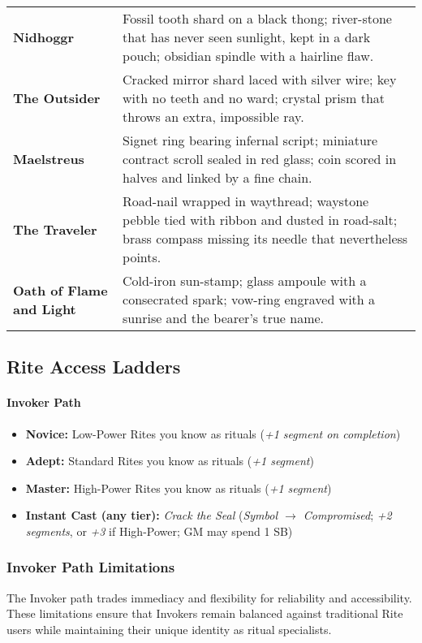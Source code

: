 \documentclass[12pt,twoside]{book}
\begin{document}
\begin{table}[htbp]
\begin{tabular}{>{\bfseries}p{4.0cm} >{\raggedright\arraybackslash}p{10.8cm}}
Nidhoggr & Fossil tooth shard on a black thong; river-stone that has never seen sunlight, kept in a dark pouch; obsidian spindle with a hairline flaw. \\
The Outsider & Cracked mirror shard laced with silver wire; key with no teeth and no ward; crystal prism that throws an extra, impossible ray. \\
Maelstreus & Signet ring bearing infernal script; miniature contract scroll sealed in red glass; coin scored in halves and linked by a fine chain. \\
The Traveler & Road-nail wrapped in waythread; waystone pebble tied with ribbon and dusted in road-salt; brass compass missing its needle that nevertheless points. \\
Oath of Flame and Light & Cold-iron sun-stamp; glass ampoule with a consecrated spark; vow-ring engraved with a sunrise and the bearer's true name. \\
\bottomrule
\end{tabular}
\end{table}
\subsection*{Rite Access Ladders}

\paragraph{Invoker Path}
\begin{itemize}
  \item \textbf{Novice:} Low-Power Rites you know as rituals (\emph{+1 segment on completion})
  \item \textbf{Adept:} Standard Rites you know as rituals (\emph{+1 segment})
  \item \textbf{Master:} High-Power Rites you know as rituals (\emph{+1 segment})
  \item \textbf{Instant Cast (any tier):} \emph{Crack the Seal} (\emph{Symbol $\rightarrow$ Compromised}; \emph{+2 segments}, or \emph{+3} if High-Power; GM may spend 1 SB)
\end{itemize}

\subsubsection{Invoker Path Limitations}

The Invoker path trades immediacy and flexibility for reliability and accessibility. These limitations ensure that Invokers remain balanced against traditional Rite users while maintaining their unique identity as ritual specialists.
\end{document}

